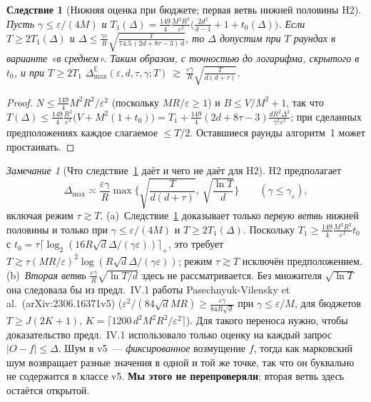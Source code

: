 \documentclass[11pt,a4paper]{article}
\numberwithin{equation}{section}
\newtheorem{corollary}[theorem]{Следствие}
\theoremstyle{definition}
\theoremstyle{remark}
\newtheorem{remark}[theorem]{Замечание}
\newcommand{\E}{\mathbb E}\newcommand{\R}{\mathbb R}\newcommand{\N}{\mathbb N}\let\Prob\relax\newcommand{\Prob}{\mathbb P}
\newcommand{\Dmax}{\Delta_{\max}}\newcommand{\Dcp}{\Delta_{\rm cp}}
\begin{document}
\begin{corollary}[Нижняя оценка при бюджете; первая ветвь нижней половины H2]\label{cor:lower}
Пусть $\gamma\le\varepsilon/(4M)$ и $T_1(\Delta)=\frac{149}4\frac{M^2R^2}{\varepsilon^2}\big(\frac{2d^2}{d-1}+1+t_0(\Delta)\big)$. Если $T\ge2T_1(\Delta)$ и
$\Delta\le\frac{\gamma\varepsilon}R\sqrt{\frac{T}{74.5\,(2d+8\tau-3)\,d}}$, то $\Delta$ допустим при $T$ раундах в варианте «в среднем». Таким образом, с точностью до логарифма, скрытого в $t_0$, и при $T\ge2T_1$
$\Dmax^{\E}(\varepsilon,d,\tau,\gamma;T)\ \gtrsim\ \frac{\varepsilon\gamma}R\sqrt{\frac T{d(d+\tau)}}$.
\end{corollary}
\begin{proof}
$N\le\frac{149}4M^2R^2/\varepsilon^2$ (поскольку $MR/\varepsilon\ge1$) и $B\le V/M^2+1$, так что $T(\Delta)\le\frac{149}4\frac{R^2}{\varepsilon^2}\big(V+M^2(1+t_0)\big)=T_1+\frac{149}4(2d+8\tau-3)\frac{dR^2\Delta^2}{\gamma^2\varepsilon^2}$; при сделанных предположениях каждое слагаемое $\le T/2$. Оставшиеся раунды алгоритм~1 может простаивать.
\end{proof}
\begin{remark}[Что следствие~\ref{cor:lower} даёт и чего не даёт для H2]\label{rem:h2}
H2 предполагает
\[\Dmax\asymp\frac{\varepsilon\gamma}R\max\Big\{\sqrt{\frac T{d(d+\tau)}},\ \sqrt{\frac{\ln T}d}\Big\}\qquad(\gamma\le\gamma_\varepsilon),\]
включая режим $\tau\gtrsim T$.
(a)~Следствие~\ref{cor:lower} доказывает только \emph{первую ветвь} нижней половины и только при $\gamma\le\varepsilon/(4M)$ и $T\ge2T_1(\Delta)$. Поскольку $T_1\ge\frac{149}4\frac{M^2R^2}{\varepsilon^2}t_0$ с $t_0=\tau\lceil\log_2(16R\sqrt d\Delta/(\gamma\varepsilon))\rceil_+$, это требует $T\gtrsim\tau(MR/\varepsilon)^2\log(R\sqrt d\Delta/(\gamma\varepsilon))$; режим $\tau\gtrsim T$ исключён предположением.
(b)~\emph{Вторая ветвь} $\frac{\varepsilon\gamma}R\sqrt{\ln T/d}$ здесь не рассматривается. Без множителя $\sqrt{\ln T}$ она следовала бы из предл.~IV.1 работы Pasechnyuk-Vilensky et al.\ (arXiv:\allowbreak2306.16371v5) ($\varepsilon^2/(84\sqrt dMR)\ge\frac{\varepsilon\gamma}{84R\sqrt d}$ при $\gamma\le\varepsilon/M$, для бюджетов $T\ge J(2K+1)$, $K=\lceil1200\,d^2M^2R^2/\varepsilon^2\rceil$). Для такого переноса нужно, чтобы доказательство предл.~IV.1 использовало только оценку на каждый запрос $|O-f|\le\Delta$. Шум в v5~--- \emph{фиксированное} возмущение $f$, тогда как марковский шум возвращает разные значения в одной и той же точке, так что он буквально не содержится в классе v5. \textbf{Мы этого не перепроверяли}; вторая ветвь здесь остаётся открытой.
\end{remark}
\end{document}
